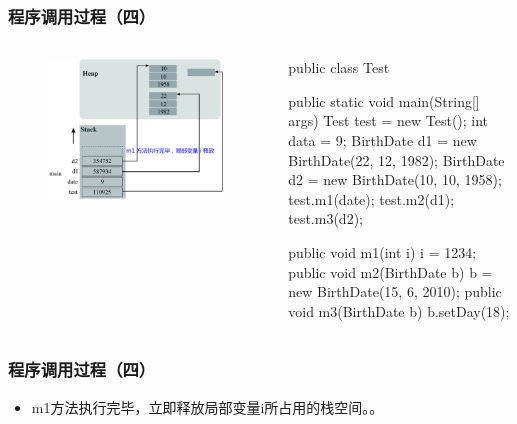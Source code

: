 \documentclass[hyperref={pdfpagelabels=false},compress,table]{beamer} %
\begin{document}
\begin{frame}[fragile] %
\frametitle{程序调用过程（四）}

\begin{columns}
\begin{figure}
\centering
\includegraphics[width=0.98\textwidth]{fig04.pdf}
\end{figure}

\begin{javaCode}\small
public class Test {
  public static void main(String[] args) {
    Test test = new Test(); 
    int data = 9; 
    BirthDate d1 = new BirthDate(22, 12, 1982); 
    BirthDate d2 = new BirthDate(10, 10, 1958); 
    test.m1(date); 
    test.m2(d1); 
    test.m3(d2);
  }

  public void m1(int i) {
    i = 1234; 
  }
  public void m2(BirthDate b) {
    b = new BirthDate(15, 6, 2010);
  }
  public void m3(BirthDate b) {
    b.setDay(18);
  }
}
\end{javaCode}
\end{columns}
\end{frame}

\begin{frame}[fragile] %
\frametitle{程序调用过程（四）}
\begin{itemize}
\item m1方法执行完毕，立即释放局部变量i所占用的栈空间。。
\end{itemize}
\end{frame}
\end{document}
